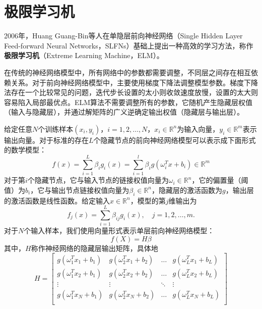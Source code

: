 \chapter{极限学习机}
2006年，Huang Guang-Bin等人\cite{huang2006extreme}在单隐层前向神经网络（Single Hidden Layer Feed-forward Neural Networks，SLFNs）基础上提出一种高效的学习方法，称作\textbf{极限学习机}（Extreme Learning Machine，ELM）。

在传统的神经网络模型中，所有网络中的参数都需要调整，不同层之间存在相互依赖关系。对于前向神经网络模型中，主要使用梯度下降法调整模型参数。梯度下降法存在一个比较常见的问题，迭代步长设置的太小则收敛速度放慢，设置的太大则容易陷入局部最优点。ELM算法不需要调整所有的参数，它随机产生隐藏层权值（输入与隐藏层），并通过解矩阵的广义逆确定输出权值（隐藏层与输出层）。

给定任意$N$个训练样本$(x_i,y_i)$，$i=1,2,\ldots,N$，$x_i\in \mathbb R^n$为输入向量，$y_i\in \mathbb R^m$表示输出向量。对于标准的存在$L$个隐藏节点的前向神经网络模型可以表示成下面形式的数学模型：
\begin{equation}
    f(x) = \sum\limits_{i=1}^L \beta_i g_i(x) = \sum\limits_{i=1}^l \beta_i g(\omega_i^T x + b_i)\in \mathbb R^m
\end{equation}
对于第$i$个隐藏节点，它与输入节点的链接权值向量为$\omega_i\in \mathbb R^n$，它的偏置量（阈值）为$b_i$，它与输出节点链接权值向量为$\beta_i \in \mathbb R^n$，隐藏层的激活函数为$g$，输出层的激活函数是线性函数。给定输入$x\in \mathbb R^n$，模型的第$j$维输出为
\begin{equation}
    f_j(x) = \sum\limits_{i=1}^L \beta_{ij} g_i(x),\quad j = 1,2,\ldots,m.
\end{equation}
对于$N$个输入样本，我们使用向量形式表示单层前向神经网络模型：
\begin{equation}
    f(X) = H \beta
\end{equation}
其中，$H$称作神经网络的隐藏层输出矩阵，具体地
\begin{equation}
    H =
    \begin{bmatrix}
    g(\omega_1^T x_1 + b_1) & g(\omega_2^T x_1 + b_2) & \ldots & g(\omega_L^T x_1 + b_L)\\
    g(\omega_1^T x_2 + b_1) & g(\omega_2^T x_2 + b_2) & \ldots & g(\omega_L^T x_2 + b_L)\\
    \vdots & \vdots & \ddots & \vdots\\
    g(\omega_1^T x_N + b_1) & g(\omega_2^T x_N + b_2) & \ldots & g(\omega_L^T x_N + b_L)\\
    \end{bmatrix}
\end{equation}
